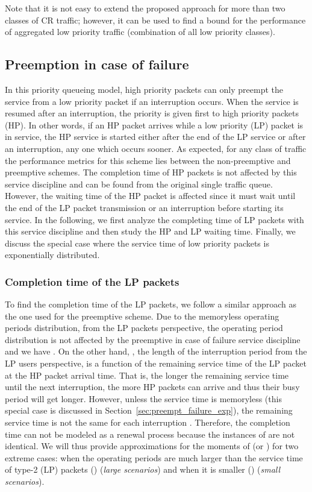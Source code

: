 \documentclass[11pt,journal,oneside,onecolumn,draftclsnofoot]{IEEEtran}
\begin{document}
Note that it is not easy to extend the proposed approach for more than two classes of CR traffic; however, it can be used to find a bound for the performance of aggregated low priority traffic (combination of all low priority classes). 


\subsection{{Preemption in case of failure}}
\label{sec:preempt_failure}

In this priority queueing model, high priority packets can only preempt the service from a low priority packet if an interruption occurs. When the service is resumed after an interruption, the priority is given first to high priority packets (HP). In other words, if an HP packet arrives while a low priority (LP) packet is in service, the HP service is started either after the end of the LP service or after an interruption, any one which occurs sooner. As expected, for any class of traffic the performance metrics for this scheme lies between the non-preemptive and preemptive schemes.  
The completion time of HP packets is not affected by this service discipline and can be found from the original single traffic queue. However, the waiting time of the HP packet is affected since it must wait until the end of the LP packet transmission or an interruption before starting its service. In the following, we first analyze the completing time of LP packets with this service discipline and then study the HP and LP waiting time. Finally, we discuss the special case where the service time of low priority packets is exponentially distributed. 

\subsubsection{Completion time of the LP packets} 
To find the completion time of the LP packets, we follow a similar approach as the one used for the preemptive scheme. Due to the memoryless operating periods distribution, from the LP packets perspective, the operating period distribution is not affected by the preemptive in case of failure service discipline and we have . On the other hand, 
, the length of the interruption period from the LP users perspective, is a function of the remaining service time of the LP packet at the HP packet arrival time. That is, the longer the remaining service time until the next interruption, the more HP packets can arrive and thus their busy period will get longer. However, unless the service time is memoryless (this special case is discussed in Section~\ref{sec:preempt_failure_exp}), the remaining service time is not the same for each interruption . Therefore, the completion time can not be modeled as a renewal process because the instances of  are not identical. 
We will thus provide approximations for the moments of  (or ) for two extreme cases: when the operating periods are much larger than the service time of type-2 (LP) packets () (\emph{large scenarios}) and when it is smaller () (\emph{small scenarios}).  
\end{document}
